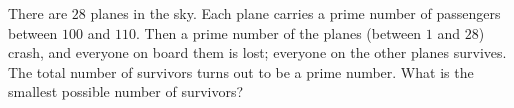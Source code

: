 There are $28$ planes in the sky. Each plane carries a prime number of passengers between $100$ and $110$. Then a prime number of the planes (between $1$ and $28$) crash, and everyone on board them is lost; everyone on the other planes survives. The total number of survivors turns out to be a prime number. What is the smallest possible number of survivors?
